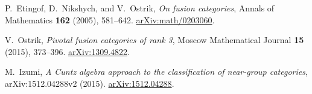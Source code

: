 P.~Etingof, D.~Nikshych, and V.~Ostrik,
\emph{On fusion categories},
Annals of Mathematics \textbf{162} (2005), 581--642.
\href{https://arxiv.org/abs/math/0203060}{arXiv:math/0203060}.

V.~Ostrik,
\emph{Pivotal fusion categories of rank 3},
Moscow Mathematical Journal \textbf{15} (2015), 373--396.
\href{https://arxiv.org/abs/1309.4822}{arXiv:1309.4822}.

M.~Izumi,
\emph{A Cuntz algebra approach to the classification of near-group categories},
arXiv:1512.04288v2 (2015).
\href{https://arxiv.org/abs/1512.04288}{arXiv:1512.04288}.
